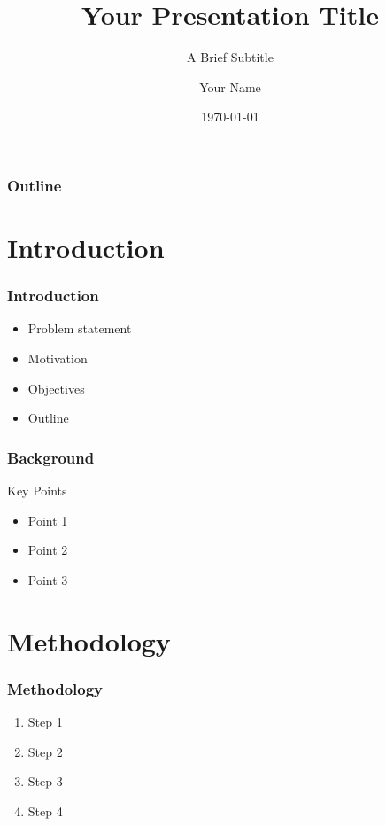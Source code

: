 \documentclass{beamer}
\title{Your Presentation Title}
\subtitle{A Brief Subtitle}
\author{Your Name}
\institute{Your Institution}
\date{\today}
\begin{document}
\begin{frame}
\titlepage
\end{frame}

\begin{frame}
\frametitle{Outline}
\tableofcontents
\end{frame}

\section{Introduction}
\begin{frame}
\frametitle{Introduction}
\begin{itemize}
    \item Problem statement
    \item Motivation
    \item Objectives
    \item Outline
\end{itemize}
\end{frame}

\begin{frame}
\frametitle{Background}
\begin{block}{Key Points}
\begin{itemize}
    \item Point 1
    \item Point 2
    \item Point 3
\end{itemize}
\end{block}
\end{frame}

\section{Methodology}
\begin{frame}
\frametitle{Methodology}
\begin{enumerate}
    \item Step 1
    \item Step 2
    \item Step 3
    \item Step 4
\end{enumerate}
\end{frame}
\end{document}

